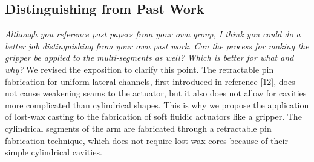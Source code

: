 \documentclass[letterpaper, 10 pt, twocolumn, conference]{article}
\begin{document}
\subsection{Distinguishing from Past Work}
\textit{Although you reference past papers from your own group, I think you could do a better job distinguishing from your own past work. Can the process for making the gripper be applied to the multi-segments as well? Which is better for what and why?}
%
We revised the exposition to clarify this point. The retractable pin fabrication for uniform lateral channels, first introduced in reference [12], does not cause weakening seams to the actuator, but it also does not allow for cavities more complicated than cylindrical shapes. This is why we propose the application of lost-wax casting to the fabrication of soft fluidic actuators like a gripper. The cylindrical segments of the arm are fabricated through a retractable pin fabrication technique, which does not require lost wax cores because of their simple cylindrical cavities.
%
\end{document}
